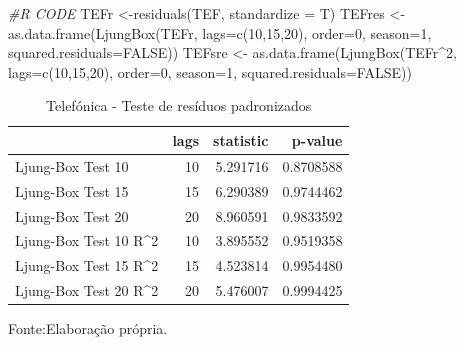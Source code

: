 \documentclass[
  12pt,
  a4paper,
  openany]{book}
\newenvironment{Shaded}{\begin{snugshade}}{\end{snugshade}}
\newcommand{\AttributeTok}[1]{\textcolor[rgb]{0.77,0.63,0.00}{#1}}
\newcommand{\CommentTok}[1]{\textcolor[rgb]{0.56,0.35,0.01}{\textit{#1}}}
\newcommand{\ConstantTok}[1]{\textcolor[rgb]{0.00,0.00,0.00}{#1}}
\newcommand{\DecValTok}[1]{\textcolor[rgb]{0.00,0.00,0.81}{#1}}
\newcommand{\FunctionTok}[1]{\textcolor[rgb]{0.00,0.00,0.00}{#1}}
\newcommand{\NormalTok}[1]{#1}
\newcommand{\OtherTok}[1]{\textcolor[rgb]{0.56,0.35,0.01}{#1}}
\newcommand{\SpecialCharTok}[1]{\textcolor[rgb]{0.00,0.00,0.00}{#1}}
\theoremstyle{definition}
\theoremstyle{definition}
\theoremstyle{definition}
\theoremstyle{remark}
\begin{document}
\scriptsize

\begin{Shaded}
\begin{Highlighting}[]
\CommentTok{\#R CODE}
\NormalTok{TEFr }\OtherTok{\textless{}{-}}\FunctionTok{residuals}\NormalTok{(TEF, }\AttributeTok{standardize =}\NormalTok{ T)}
\NormalTok{TEFres }\OtherTok{\textless{}{-}} \FunctionTok{as.data.frame}\NormalTok{(}\FunctionTok{LjungBox}\NormalTok{(TEFr, }\AttributeTok{lags=}\FunctionTok{c}\NormalTok{(}\DecValTok{10}\NormalTok{,}\DecValTok{15}\NormalTok{,}\DecValTok{20}\NormalTok{), }\AttributeTok{order=}\DecValTok{0}\NormalTok{, }\AttributeTok{season=}\DecValTok{1}\NormalTok{, }\AttributeTok{squared.residuals=}\ConstantTok{FALSE}\NormalTok{))}
\NormalTok{TEFsre }\OtherTok{\textless{}{-}} \FunctionTok{as.data.frame}\NormalTok{(}\FunctionTok{LjungBox}\NormalTok{(TEFr}\SpecialCharTok{\^{}}\DecValTok{2}\NormalTok{, }\AttributeTok{lags=}\FunctionTok{c}\NormalTok{(}\DecValTok{10}\NormalTok{,}\DecValTok{15}\NormalTok{,}\DecValTok{20}\NormalTok{), }\AttributeTok{order=}\DecValTok{0}\NormalTok{, }\AttributeTok{season=}\DecValTok{1}\NormalTok{, }\AttributeTok{squared.residuals=}\ConstantTok{FALSE}\NormalTok{))}
\end{Highlighting}
\end{Shaded}

\normalsize

\begin{table}[!h]

\caption{\label{tab:TEFLjunk}Telefónica - Teste de resíduos padronizados}
\centering
\begin{tabular}[t]{lrrr}
\toprule
  & lags & statistic & p-value\\
\midrule
Ljung-Box Test 10 & 10 & 5.291716 & 0.8708588\\
Ljung-Box Test 15 & 15 & 6.290389 & 0.9744462\\
Ljung-Box Test 20 & 20 & 8.960591 & 0.9833592\\
Ljung-Box Test 10 R\textasciicircum{}2 & 10 & 3.895552 & 0.9519358\\
Ljung-Box Test 15 R\textasciicircum{}2 & 15 & 4.523814 & 0.9954480\\
\addlinespace
Ljung-Box Test 20 R\textasciicircum{}2 & 20 & 5.476007 & 0.9994425\\
\bottomrule
\end{tabular}
\end{table}
\FloatBarrier
\centering

Fonte:Elaboração própria.
\end{document}
